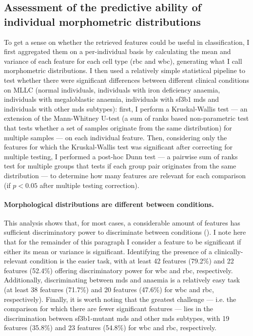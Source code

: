 \subsection{Assessment of the predictive ability of individual morphometric distributions}

To get a sense on whether the retrieved features could be useful in classification, I first aggregated them on a per-individual basis by calculating the mean and variance of each feature for each cell type (\ac{rbc} and \ac{wbc}), generating what I call morphometric distributions. I then used a relatively simple statistical pipeline to test whether there were significant differences between different clinical conditions on MLLC (normal individuals, individuals with iron deficiency anaemia, individuals with megaloblastic anaemia, individuals with \ac{sf3b1} \ac{mds} and individuals with other \ac{mds} subtypes): first, I perform a Kruskal-Wallis test --- an extension of the Mann-Whitney U-test (a sum of ranks based non-parametric test that tests whether a set of samples originate from the same distribution) for multiple samples --- on each individual feature. Then, considering only the features for which the Kruskal-Wallis test was significant after correcting for multiple testing, I performed a post-hoc Dunn test --- a pairwise sum of ranks test for multiple groups that tests if each group pair originates from the same distribution --- to determine how many features are relevant for each comparison (if $p<0.05$ after multiple testing correction).

\paragraph{Morphological distributions are different between conditions.} This analysis shows that, for most cases, a considerable amount of features has sufficient discriminatory power to discriminate between conditions (). I note here that for the remainder of this paragraph I consider a feature to be significant if either its mean or variance is significant. Identifying the presence of a clinically-relevant condition is the easier task, with at least 42 features (79.2\%) and 22 features (52.4\%) offering discriminatory power for \ac{wbc} and \ac{rbc}, respectively. Additionally, discriminating between \ac{mds} and anaemia is a relatively easy task (at least 38 features (71.7\%) and 20 features (47.6\%) for \ac{wbc} and \ac{rbc}, respectively). Finally, it is worth noting that the greatest challenge --- i.e. the comparison for which there are fewer significant features --- lies in the discrimination between \ac{sf3b1}-mutant \ac{mds} and other \ac{mds} subtypes, with 19 features (35.8\%) and 23 features (54.8\%) for \ac{wbc} and \ac{rbc}, respectively. 


